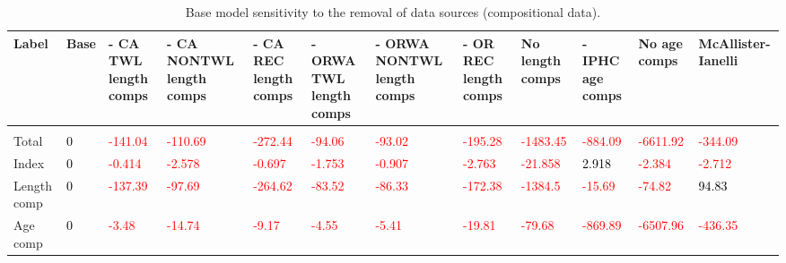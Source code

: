\documentclass[
]{scrartcl}
\begin{document}
\begin{landscape}
\begingroup\fontsize{9}{11}\selectfont

\begin{longtable}[t]{ll>{\raggedright\arraybackslash}p{4em}>{\raggedright\arraybackslash}p{4em}>{\raggedright\arraybackslash}p{4em}>{\raggedright\arraybackslash}p{4em}>{\raggedright\arraybackslash}p{4em}>{\raggedright\arraybackslash}p{4em}>{\raggedright\arraybackslash}p{4em}>{\raggedright\arraybackslash}p{4em}>{\raggedright\arraybackslash}p{4em}>{\raggedright\arraybackslash}p{4em}}

\caption{\label{tbl-sensitivities-like-comps}Base model sensitivity to
the removal of data sources (compositional data).}

\tabularnewline

\toprule
Label & Base & - CA TWL length comps & - CA NONTWL length comps & - CA REC length comps & - ORWA TWL length comps & - ORWA NONTWL length comps & - OR REC length comps & No length comps & - IPHC age comps & No age comps & McAllister-Ianelli\\
\midrule
\addlinespace[0.3em]
\multicolumn{12}{l}{\textbf{Diff. in likelihood from base model}}\\
\hspace{1em}Total & \textcolor{black}{0} & \textcolor{red}{-141.04} & \textcolor{red}{-110.69} & \textcolor{red}{-272.44} & \textcolor{red}{-94.06} & \textcolor{red}{-93.02} & \textcolor{red}{-195.28} & \textcolor{red}{-1483.45} & \textcolor{red}{-884.09} & \textcolor{red}{-6611.92} & \textcolor{red}{-344.09}\\
\hspace{1em}Index & \textcolor{black}{0} & \textcolor{red}{-0.414} & \textcolor{red}{-2.578} & \textcolor{red}{-0.697} & \textcolor{red}{-1.753} & \textcolor{red}{-0.907} & \textcolor{red}{-2.763} & \textcolor{red}{-21.858} & \textcolor{black}{2.918} & \textcolor{red}{-2.384} & \textcolor{red}{-2.712}\\
\hspace{1em}Length comp & \textcolor{black}{0} & \textcolor{red}{-137.39} & \textcolor{red}{-97.69} & \textcolor{red}{-264.62} & \textcolor{red}{-83.52} & \textcolor{red}{-86.33} & \textcolor{red}{-172.38} & \textcolor{red}{-1384.5} & \textcolor{red}{-15.69} & \textcolor{red}{-74.82} & \textcolor{black}{94.83}\\
\hspace{1em}Age comp & \textcolor{black}{0} & \textcolor{red}{-3.48} & \textcolor{red}{-14.74} & \textcolor{red}{-9.17} & \textcolor{red}{-4.55} & \textcolor{red}{-5.41} & \textcolor{red}{-19.81} & \textcolor{red}{-79.68} & \textcolor{red}{-869.89} & \textcolor{red}{-6507.96} & \textcolor{red}{-436.35}\\

\end{longtable}
\end{landscape}
\end{document}
